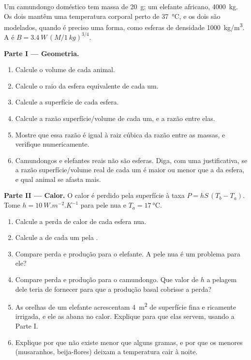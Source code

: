 \begin{problem}
\label{pb:b1:organism-environment:1}
Um camundongo doméstico tem massa de \qty{20}{g}; um elefante africano,
\qty{4000}{kg}. Os dois mantêm uma temperatura corporal perto de
\qty{37}{\celsius}, e os dois são modelados, quando é preciso uma forma,
como esferas de densidade \qty{1000}{kg/m^3}. A  é
$B = \qty{3.4}{W}\,(M/\qty{1}{kg})^{3/4}$.

\medskip
\noindent\textbf{Parte I --- Geometria.}
\begin{enumerate}
  \item Calcule o volume de cada animal.
  \item Calcule o raio da esfera equivalente de cada um.
  \item Calcule a superfície de cada esfera.
  \item Calcule a razão superfície/volume de cada um, e a razão entre
        elas.
  \item Mostre que essa razão é igual à raiz cúbica da razão entre as
        massas, e verifique numericamente.
  \item Camundongos e elefantes reais não são esferas. Diga, com uma
        justificativa, se a razão superfície/volume real de cada um é
        maior ou menor que a da esfera, e qual animal se afasta mais.
\end{enumerate}

\medskip
\noindent\textbf{Parte II --- Calor.}
O calor é perdido pela superfície à taxa $P = hS\,(T_b - T_a)$. Tome
$h = \qty{10}{W.m^{-2}.K^{-1}}$ para pele nua e $T_a =
\qty{17}{\celsius}$.
\begin{enumerate}[resume]
  \item Calcule a perda de calor de cada esfera nua.
  \item Calcule a  de cada um pela .
  \item Compare perda e produção para o elefante. A pele nua é um
        problema para ele?
  \item Compare perda e produção para o camundongo. Que valor de $h$ a
        pelagem dele teria de fornecer para que a produção basal
        cobrisse a perda?
  \item As orelhas de um elefante acrescentam \qty{4}{m^2} de
        superfície fina e ricamente irrigada, e ele as abana no calor.
        Explique para que elas servem, usando a Parte I.
  \item Explique por que não existe  menor que alguns gramas, e
        por que os menores (musaranhos, beija-flores) deixam a
        temperatura cair à noite.
\end{enumerate}


\end{problem}
